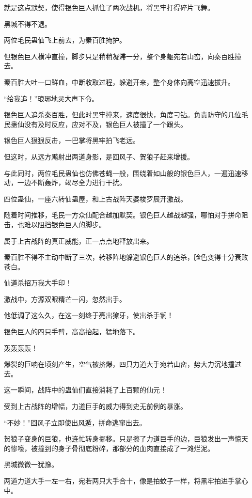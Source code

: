 \begin{this_body}
就是这点默契，使得银色巨人抓住了两次战机，将黑牢打得碎片飞舞。

黑城不得不退。

两位毛民蛊仙飞上前去，为秦百胜掩护。

但银色巨人横冲直撞，脚步只是稍稍凝滞一分，整个身躯宛若山峦，向秦百胜撞去。

秦百胜大吐一口鲜血，中断收取过程，躲避开来，整个身体向高空迅速拔升。

“给我追！”琅琊地灵大声下令。

银色巨人追杀秦百胜，但此时黑牢撞来，速度很快，角度刁钻。负责防守的几位毛民蛊仙没有及时反应，应对不及，银色巨人被撞了一个跟头。

银色巨人狠狠反击，一巴掌将黑牢拍飞老远。

但这时，从远方飚射出两道身影，是回风子、贺狼子赶来增援。

与此同时，两位毛民蛊仙也仿佛苍蝇一般，围绕着如山般的银色巨人，一遍迅速移动，一边不断轰炸，竭尽全力进行干扰。

四位蛊仙，一座六转仙蛊屋，和上古战阵天婆梭罗展开激战。

随着时间推移，毛民一方众仙配合越加默契。银色巨人越战越强，哪怕对手拼命阻击，也难以阻挡银色巨人的脚步。

属于上古战阵的真正威能，正一点点地释放出来。

秦百胜不得不主动中断了三次，转移阵地躲避银色巨人的追杀，脸色变得十分衰败苍白。

仙道杀招万我大手印！

激战中，方源双眼精芒一闪，忽然出手。

他低调了这么久，在这一刻终于亮出獠牙，使出杀手锏！

银色巨人的四只手臂，高高抬起，猛地落下。

轰轰轰轰！

爆裂的巨响在顷刻产生，空气被挤爆，四只力道大手宛若山峦，势大力沉地撞过去。

这一瞬间，战阵中的蛊仙们直接消耗了上百颗的仙元！

受到上古战阵的增幅，力道巨手的威力得到史无前例的暴涨。

“不妙！”回风子立即使出风遁，拼命逃窜出去。

贺狼子变身的巨狼，也连忙转身挪移。只是擦了力道巨手的边，巨狼发出一声惊天的惨嚎，被撞到的身子骨彻底粉碎，那部分的血肉直接成了一滩烂泥。

黑城微微一犹豫。

两道力道大手一左一右，宛若两只大手合十，像是拍蚊子一样，将黑牢拍进手掌心中。


\end{this_body}
